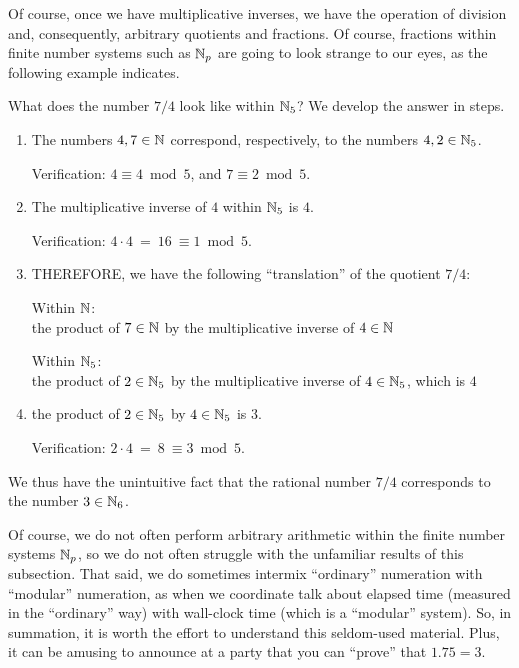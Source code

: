 \medskip

Of course, once we have multiplicative inverses, we have the operation
of division and, consequently, arbitrary quotients and fractions.  Of
course, fractions within finite number systems such as $\mathbb{N}_p$ are
going to look strange to our eyes, as the following example indicates.

What does the number $7/4$ look like within $\mathbb{N}_5$?  We develop the
answer in steps.
\bigskip

\noindent {}
\begin{enumerate}
\item
The numbers $4, 7 \in \mathbb{N}$ correspond, respectively, to the numbers $4,
2 \in \mathbb{N}_5$.

Verification:
$4 \equiv 4 \bmod 5$, and $7 \equiv 2 \bmod 5$.

\item
The multiplicative inverse of $4$ within $\mathbb{N}_5$ is $4$.

Verification:
$4 \cdot 4 \ = \ 16 \ \equiv 1 \bmod 5$.

\item
THEREFORE, we have the following ``translation'' of the quotient $7/4$:

Within $\mathbb{N}$: \\
the product of $7 \in \mathbb{N}$ by the multiplicative inverse of $4 \in \mathbb{N}$

Within $\mathbb{N}_5$: \\
the product of $2 \in \mathbb{N}_5$ by the multiplicative inverse of $4 \in
\mathbb{N}_5$, which is $4$

\item
the product of $2 \in \mathbb{N}_5$ by $4 \in \mathbb{N}_5$ is $3$.

Verification:
$2 \cdot 4 \ = \ 8 \ \equiv 3 \bmod 5$.
\end{enumerate}
We thus have the unintuitive fact that the rational number $7/4$
corresponds to the number $3 \in \mathbb{N}_6$.

Of course, we do not often perform arbitrary arithmetic within the
finite number systems $\mathbb{N}_p$, so we do not often struggle with the
unfamiliar results of this subsection.  That said, we do sometimes
intermix ``ordinary'' numeration with ``modular'' numeration, as when
we coordinate talk about elapsed time (measured in the ``ordinary''
way) with wall-clock time (which is a ``modular'' system).  So, in
summation, it is worth the effort to understand this seldom-used
material.  Plus, it can be amusing to announce at a party that you can
``prove'' that $1.75 = 3$.

